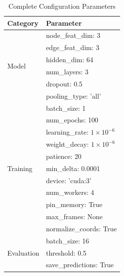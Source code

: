\documentclass[11pt,a4paper]{article}
\begin{document}
\begin{table}[H]
\centering
\caption{Complete Configuration Parameters}
\scriptsize
\begin{tabular}{ll}
\toprule
\textbf{Category} & \textbf{Parameter} \\
\midrule
\multirow{6}{*}{Model} & node\_feat\_dim: 3 \\
 & edge\_feat\_dim: 3 \\
 & hidden\_dim: 64 \\
 & num\_layers: 3 \\
 & dropout: 0.5 \\
 & pooling\_type: 'all' \\
\midrule
\multirow{11}{*}{Training} & batch\_size: 1 \\
 & num\_epochs: 100 \\
 & learning\_rate: $1 \times 10^{-6}$ \\
 & weight\_decay: $1 \times 10^{-6}$ \\
 & patience: 20 \\
 & min\_delta: 0.0001 \\
 & device: 'cuda:3' \\
 & num\_workers: 4 \\
 & pin\_memory: True \\
 & max\_frames: None \\
 & normalize\_coords: True \\
\midrule
\multirow{3}{*}{Evaluation} & batch\_size: 16 \\
 & threshold: 0.5 \\
 & save\_predictions: True \\
\bottomrule
\end{tabular}
\end{table}
\end{document}
